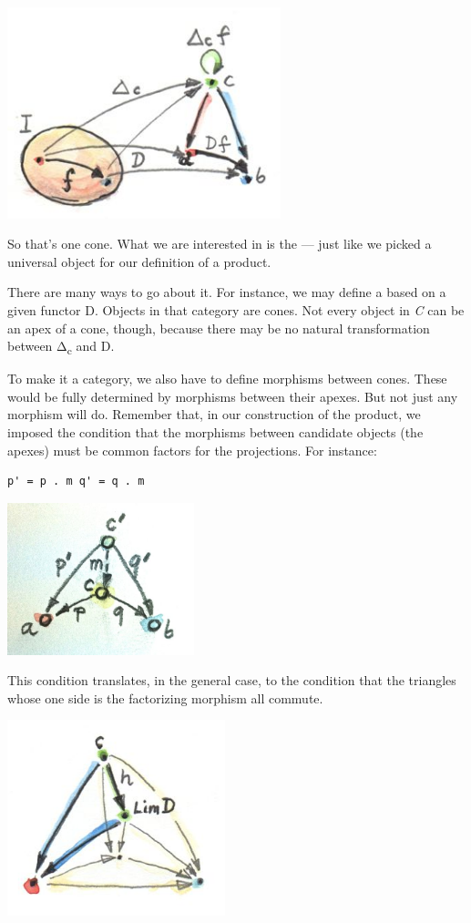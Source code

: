 \includegraphics[width=3.12500in]{images/conenaturality.jpg}

So that's one cone. What we are interested in is the  --- just like we picked a universal object for our definition of a
product.

There are many ways to go about it. For instance, we may define a
 based on a given functor D. Objects in that
category are cones. Not every object  in \emph{C} can be an
apex of a cone, though, because there may be no natural transformation
between Δ\textsubscript{c} and D.

To make it a category, we also have to define morphisms between cones.
These would be fully determined by morphisms between their apexes. But
not just any morphism will do. Remember that, in our construction of the
product, we imposed the condition that the morphisms between candidate
objects (the apexes) must be common factors for the projections. For
instance:

\begin{verbatim}
p' = p . m q' = q . m
\end{verbatim}

\includegraphics[width=2.13542in]{images/productranking.jpg}

This condition translates, in the general case, to the condition that
the triangles whose one side is the factorizing morphism all commute.

\hypertarget{attachment_4487}{}
\includegraphics[width=2.48958in]{images/conecommutativity.jpg}

